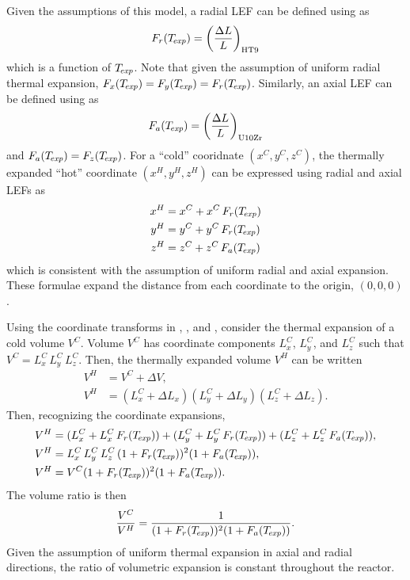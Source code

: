     Given the assumptions of this model, a radial LEF can be defined using 
     as
    \begin{equation}
      \label{eq:lef_r}
      F_r(T_{\!\mbox{\scriptsize \em exp}}) = \left(\frac{\Delta L}{L}\right)_{\text{HT9}}
    \end{equation}
    which is a function of $T_{\!\mbox{\scriptsize \em exp}}$. Note that given the assumption of uniform
    radial thermal expansion, ${F_x(T_{\!\mbox{\scriptsize \em exp}}) = F_y(T_{\!\mbox{\scriptsize \em exp}}) = F_r(T_{\!\mbox{\scriptsize \em exp}})}$.
    Similarly, an axial LEF can be defined using  as 
    \begin{equation}
      \label{eq:lef_a}
      F_a(T_{\!\mbox{\scriptsize \em exp}}) = \left(\frac{\Delta L}{L}\right)_{\text{U10Zr}}
    \end{equation}
    and $F_a(T_{\!\mbox{\scriptsize \em exp}}) = F_z(T_{\!\mbox{\scriptsize \em exp}})$. For a ``cold'' cooridnate 
    $(x^C,y^C,z^C)$, the thermally expanded ``hot'' coordinate $(x^H,y^H,z^H)$ 
    can be expressed using radial and axial LEFs as
    \begin{align}
      \label{eq:expand_x}
      x^H &= x^C + x^C \, F_r(T_{\!\mbox{\scriptsize \em exp}}) \\
      \label{eq:expand_y}
      y^H &= y^C + y^C \, F_r(T_{\!\mbox{\scriptsize \em exp}}) \\
      \label{eq:expand_z}
      z^H &= z^C + z^C \, F_a(T_{\!\mbox{\scriptsize \em exp}})
    \end{align}
    which is consistent with the assumption of uniform radial and axial 
    expansion. These formulae expand the distance from each coordinate to the
    origin, $(0,0,0)$.

    Using the coordinate transforms in , , 
    and , consider the thermal expansion of a cold volume 
    $V^C$.  Volume $V^C$ has coordinate components $L_x^C$, $L_y^C$, and $L_z^C$
    such that ${V^C = L_x^C \, L_y^C \, L_z^C}$. Then, the thermally expanded 
    volume $V^H$ can be written
    \begin{align}
      V^H &= V^C + \Delta V, \\
      V^H &= (L_x^C + \Delta L_x) (L_y^C + \Delta L_y) (L_z^C + \Delta L_z). 
    \end{align}
    Then, recognizing the coordinate expansions,
    \begin{align}
      V^H &= (L_x^C + L_x^C \, F_r(T_{\!\mbox{\scriptsize \em exp}})) + (L_y^C + L_y^C \, F_r(T_{\!\mbox{\scriptsize \em exp}})) + 
        (L_z^C + L_z^C \, F_a(T_{\!\mbox{\scriptsize \em exp}})), \\
      V^H &= L_x^C \, L_y^C \, L_z^C \, (1 + F_r(T_{\!\mbox{\scriptsize \em exp}}))^2 (1+F_a(T_{\!\mbox{\scriptsize \em exp}})), \\
      V^H &= V^C (1 + F_r(T_{\!\mbox{\scriptsize \em exp}}))^2 (1+F_a(T_{\!\mbox{\scriptsize \em exp}})).
    \end{align}
    The volume ratio is then
    \begin{equation}
      \label{eq:volume_ratio}
      \frac{V^C}{V^H} = \frac{1}{(1+F_r(T_{\!\mbox{\scriptsize \em exp}}))^2 (1+F_a(T_{\!\mbox{\scriptsize \em exp}}))}.
    \end{equation}
    Given the assumption of uniform thermal expansion in axial and radial
    directions, the ratio of volumetric expansion is constant throughout the
    reactor.

